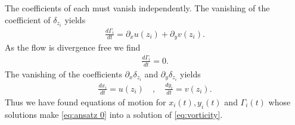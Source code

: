 \documentclass[12pt]{amsart}
\theoremstyle{remark}
\begin{document}
The coefficients of each must vanish independently.
The vanishing of the coefficient of $\delta_{z_i}$ yields
\begin{align*}
  \frac{d\Gamma_i}{dt} = \partial_x u(z_i) + \partial_y v(z_i).
\end{align*}
As the flow is divergence free we find
\begin{align*}
  \frac{d\Gamma_i}{dt} = 0.
\end{align*}
The vanishing of the coefficients $\partial_x \delta_{z_i}$ and $\partial_y \delta_{z_i}$ yields
\begin{align}
  \frac{dx_i}{dt} = u(z_i) \quad , \quad \frac{dy_i}{dt} = v(z_i).
  \label{eq:point motion}
\end{align}
Thus we have found equations of motion for $x_i(t),y_i(t)$ and $\Gamma_i(t)$
whose solutions make \eqref{eq:ansatz 0} into a solution of \eqref{eq:vorticity}.
\end{document}
